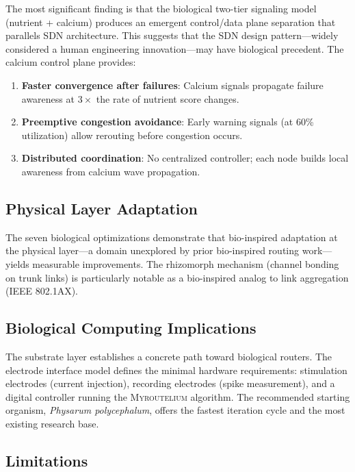 \documentclass[conference,10pt]{IEEEtran}
\newcommand{\myc}{\textsc{Myroutelium}}
\begin{document}
The most significant finding is that the biological two-tier signaling model (nutrient + calcium) produces an emergent control/data plane separation that parallels SDN architecture. This suggests that the SDN design pattern---widely considered a human engineering innovation---may have biological precedent. The calcium control plane provides:

\begin{enumerate}
    \item \textbf{Faster convergence after failures}: Calcium signals propagate failure awareness at $3\times$ the rate of nutrient score changes.
    \item \textbf{Preemptive congestion avoidance}: Early warning signals (at 60\% utilization) allow rerouting before congestion occurs.
    \item \textbf{Distributed coordination}: No centralized controller; each node builds local awareness from calcium wave propagation.
\end{enumerate}

\subsection{Physical Layer Adaptation}

The seven biological optimizations demonstrate that bio-inspired adaptation at the physical layer---a domain unexplored by prior bio-inspired routing work---yields measurable improvements. The rhizomorph mechanism (channel bonding on trunk links) is particularly notable as a bio-inspired analog to link aggregation (IEEE 802.1AX).

\subsection{Biological Computing Implications}

The substrate layer establishes a concrete path toward biological routers. The electrode interface model defines the minimal hardware requirements: stimulation electrodes (current injection), recording electrodes (spike measurement), and a digital controller running the \myc{} algorithm. The recommended starting organism, \emph{Physarum polycephalum}, offers the fastest iteration cycle and the most existing research base.

\subsection{Limitations}
\end{document}
